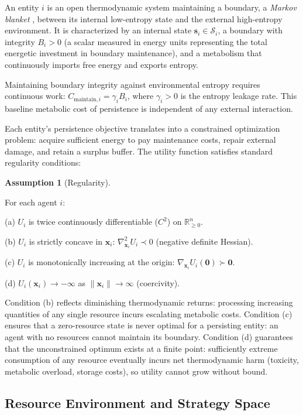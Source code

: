 \documentclass[11pt]{article}
\theoremstyle{plain}
\theoremstyle{definition}
\newtheorem{assumption}[definition]{Assumption}
\theoremstyle{remark}
\let\origsubsection\subsection
\renewcommand{\subsection}{\needspace{7\baselineskip}\origsubsection}
\begin{document}
An entity \(i\) is an open thermodynamic system maintaining a boundary,
a \emph{Markov blanket} \citep{Pearl2000, Friston2013}, between its
internal low-entropy state and the external high-entropy environment. It
is characterized by an internal state
\(\mathbf{s}_i \in \mathcal{S}_i\), a boundary with integrity
\(B_i > 0\) (a scalar measured in energy units representing the total
energetic investment in boundary maintenance), and a metabolism that
continuously imports free energy and exports entropy.

Maintaining boundary integrity against environmental entropy requires
continuous work: \(C_{\text{maintain},i} = \gamma_i B_i\), where
\(\gamma_i > 0\) is the entropy leakage rate. This baseline metabolic
cost of persistence is independent of any external interaction.

Each entity's persistence objective translates into a constrained
optimization problem: acquire sufficient energy to pay maintenance
costs, repair external damage, and retain a surplus buffer. The utility
function satisfies standard regularity conditions:

\begin{assumption}[Regularity]
\label{asm-regularity}

For each agent $i$:

(a) $U_i$ is twice continuously differentiable ($C^2$) on $\mathbb{R}_{\geq 0}^n$.

(b) $U_i$ is strictly concave in $\mathbf{x}_i$: $\nabla^2_{\mathbf{x}_i} U_i \prec 0$ (negative definite Hessian).

(c) $U_i$ is monotonically increasing at the origin: $\nabla_{\mathbf{x}_i} U_i(\mathbf{0}) \succ \mathbf{0}$.

(d) $U_i(\mathbf{x}_i) \to -\infty$ as $\|\mathbf{x}_i\| \to \infty$ (coercivity).

Condition (b) reflects diminishing thermodynamic returns: processing increasing quantities of any single resource incurs escalating metabolic costs. Condition (c) ensures that a zero-resource state is never optimal for a persisting entity: an agent with no resources cannot maintain its boundary. Condition (d) guarantees that the unconstrained optimum exists at a finite point: sufficiently extreme consumption of any resource eventually incurs net thermodynamic harm (toxicity, metabolic overload, storage costs), so utility cannot grow without bound.
\end{assumption}

\subsection{Resource Environment and Strategy
Space}\label{resource-environment-and-strategy-space}
\end{document}
